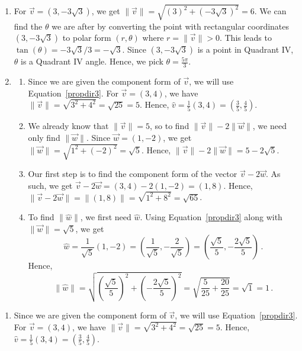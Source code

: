 \begin{example}
\begin{enumerate}
\item  For $\vec{v} =  \left(3, -3\sqrt{3}\right)$, we get $\| \vec{v} \| = \sqrt{(3)^2+(-3\sqrt{3})^2} = 6$.  We can find the $\theta$ we are after by converting the point with rectangular coordinates $(3, -3\sqrt{3})$ to polar form $(r,\theta)$ where $r = \|\vec{v}\| >0$.  This leads to $\tan(\theta) = -3\sqrt{3}/3 = -\sqrt{3}$. Since  $(3, -3\sqrt{3})$ is a point in Quadrant IV, $\theta$ is a Quadrant IV angle.  Hence, we pick $\theta = \frac{5\pi}{3}$.  

\item  \begin{enumerate} \item  Since we are given the component form of $\vec{v}$, we will use Equation~\eqref{propdir3}.  For $\vec{v} = \left(3,4\right)$, we have $\| \vec{v} \| = \sqrt{3^2+4^2} = \sqrt{25} = 5$.  Hence, $\hat{v} = \frac{1}{5} \left( 3, 4 \right) = \left(\frac{3}{5}, \frac{4}{5}\right)$.


\item  We already know that $\| \vec{v} \| = 5$, so to find  $\| \vec{v} \| -2 \|\vec{w}\|$, we need only find $\| \vec{w} \|$.  Since $\vec{w} = \left(1, -2\right)$, we get $\| \vec{w} \| = \sqrt{1^2+(-2)^2} = \sqrt{5}$.  Hence, $\| \vec{v} \| -2 \|\vec{w}\| = 5 - 2\sqrt{5}$.

\item  Our first step is to find the component form of the vector $\vec{v} - 2\vec{w}$.  As such, we get $\vec{v} - 2 \vec{w} = \left(3,4\right) - 2\left(1,-2\right) = \left(1, 8\right)$.  Hence,  $\| \vec{v} -2\vec{w}\| =  \| \left(1, 8\right)\| = \sqrt{1^2+8^2} = \sqrt{65}$.


\item  To find $\| \hat{w} \|$, we first need $\hat{w}$.  Using Equation~\eqref{propdir3} along with $\| \vec{w} \| = \sqrt{5}$,  we get  
$$\hat{w} = \frac{1}{\sqrt{5}} \left(1, -2\right) = \left( \frac{1}{\sqrt{5}}, -\frac{2}{\sqrt{5}}\right)  = \left( \frac{\sqrt{5}}{5}, -\frac{2\sqrt{5}}{5}\right)\,.$$
 Hence, 
$$\| \hat{w} \| = \sqrt{\left( \frac{\sqrt{5}}{5}\right)^2 + \left(-\frac{2\sqrt{5}}{5}\right)^2} = \sqrt{\frac{5}{25} + \frac{20}{25}} = \sqrt{1} = 1\,.$$ 


\end{enumerate}

\end{enumerate}
\fi

\ifvc
\begin{enumerate} \item  Since we are given the component form of $\vec{v}$, we will use Equation~\eqref{propdir3}.  For $\vec{v} = \left(3,4\right)$, we have $\| \vec{v} \| = \sqrt{3^2+4^2} = \sqrt{25} = 5$.  Hence, $\hat{v} = \frac{1}{5} \left( 3, 4 \right) = \left(\frac{3}{5}, \frac{4}{5}\right)$.
	

\end{enumerate}
\end{example}
